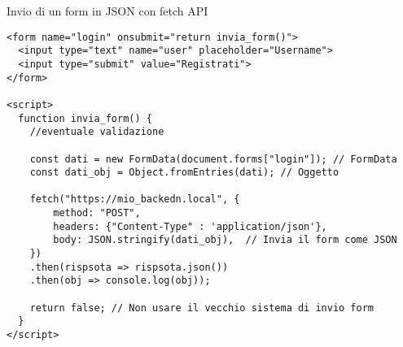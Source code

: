 \begin{frame}[fragile]{Invio di un form in JSON con fetch API}\transfade\centering
  \begin{verbatim}
<form name="login" onsubmit="return invia_form()">
  <input type="text" name="user" placeholder="Username">
  <input type="submit" value="Registrati">
</form>

<script>
  function invia_form() {
    //eventuale validazione

    const dati = new FormData(document.forms["login"]); // FormData
    const dati_obj = Object.fromEntries(dati); // Oggetto

    fetch("https://mio_backedn.local", {
        method: "POST",
        headers: {"Content-Type" : 'application/json'},
        body: JSON.stringify(dati_obj),  // Invia il form come JSON
    })
    .then(rispsota => rispsota.json())
    .then(obj => console.log(obj));

    return false; // Non usare il vecchio sistema di invio form
  }
</script>
  \end{verbatim}
\end{frame}